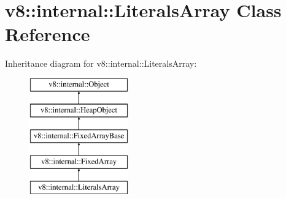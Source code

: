 \hypertarget{classv8_1_1internal_1_1_literals_array}{}\section{v8\+:\+:internal\+:\+:Literals\+Array Class Reference}
\label{classv8_1_1internal_1_1_literals_array}
Inheritance diagram for v8\+:\+:internal\+:\+:Literals\+Array\+:\begin{figure}[H]
\begin{center}
\leavevmode
\includegraphics[height=5.000000cm]{classv8_1_1internal_1_1_literals_array}
\end{center}
\end{figure}
